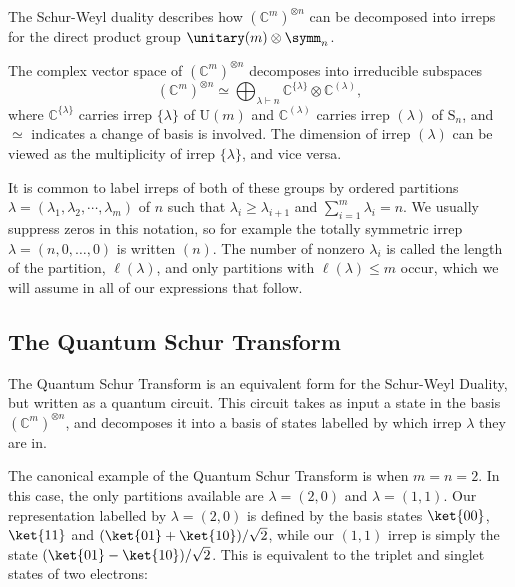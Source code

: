 The Schur-Weyl duality describes how $(\mathbb{C}^m)^{\otimes n}$ can be decomposed into irreps for the direct product group $\unitary(m)\otimes\symm_n$.

\begin{theorem}
The complex vector space of $(\mathbb{C}^m)^{\otimes n}$ decomposes into irreducible subspaces
\begin{equation}
(\mathbb{C}^m)^{\otimes n} \simeq \bigoplus_{\lambda\vdash n} \mathbb{C}^{\{\lambda\}} \otimes \mathbb{C}^{(\lambda)} ,
\end{equation}
where $\mathbb{C}^{\{\lambda\}}$ carries irrep $\{\lambda\}$ of $\textrm{U}(m)$ and $\mathbb{C}^{(\lambda)}$ carries irrep $(\lambda)$ of $\textrm{S}_n$, and $\simeq$ indicates a change of basis is involved.
The dimension of irrep $(\lambda)$ can be viewed as the multiplicity of irrep $\{\lambda\}$, and vice versa.
\end{theorem}

It is common to label irreps of both of these groups by ordered partitions $\lambda = (\lambda_1,\lambda_2,\cdots,\lambda_m)$ of $n$ such that $\lambda_i \geq \lambda_{i+1}$ and $\sum_{i = 1}^m \lambda_i = n$.
We usually suppress zeros in this notation, so for example the totally symmetric irrep $\lambda=(n, 0,\dots,0)$ is written $(n)$. 
The number of nonzero $\lambda_i$ is called the length of the partition, $\ell(\lambda)$, and only partitions with $\ell(\lambda) \leq m$ occur, which we will assume in all of our expressions that follow.

\subsection{The Quantum Schur Transform}

The Quantum Schur Transform is an equivalent form for the Schur-Weyl Duality, but written as a quantum circuit. This circuit takes as input a state in the basis $(\mathbb{C}^m)^{\otimes n}$, and decomposes it into a basis of states labelled by which irrep $\lambda$ they are in.

The canonical example of the Quantum Schur Transform is when $m=n=2$. In this case, the only partitions available are $\lambda=(2,0)$ and $\lambda=(1,1)$. Our representation labelled by $\lambda=(2,0)$ is defined by the basis states $\ket{00}$, $\ket{11}$ and $(\ket{01}+\ket{10})/\sqrt{2}$, while our $(1,1)$ irrep is simply the state $(\ket{01}-\ket{10})/\sqrt{2}$. This is equivalent to the triplet and singlet states of two electrons:

